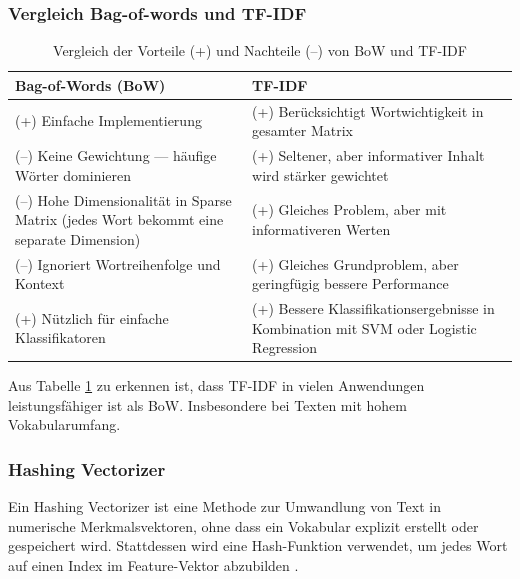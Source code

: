 \subsubsection{Vergleich Bag-of-words und TF-IDF}

\begin{table}[!ht]
    \renewcommand{\arraystretch}{1.3}
    \centering
        \begin{tabular}{|p{6.6cm}|p{6.6cm}|}
            \hline
            \rowcolor{lightgray} \textbf{Bag-of-Words (BoW)} & \textbf{TF-IDF} \\
            \hline
            (+) Einfache Implementierung \cite{cichosz2018forum} & (+) Berücksichtigt Wortwichtigkeit in gesamter Matrix  \cite{elov2023uzbek} \\
            \hline
            (–) Keine Gewichtung — häufige Wörter dominieren & (+) Seltener, aber informativer Inhalt wird stärker gewichtet \cite{das2023tfidf} \\
            \hline
            (–) Hohe Dimensionalität in Sparse Matrix (jedes Wort bekommt eine separate Dimension) \cite{ibm_bow} & (+) Gleiches Problem, aber mit informativeren Werten \cite{alzami2020tfidf} \\
            \hline
            (–) Ignoriert Wortreihenfolge und Kontext \cite{umar2022sentiment} & (+) Gleiches Grundproblem, aber geringfügig bessere Performance \cite{parmar2024stacking} \\
            \hline
            (+) Nützlich für einfache Klassifikatoren & (+) Bessere Klassifikationsergebnisse in Kombination mit SVM oder Logistic Regression \cite{iyer2024sentiment} \\
            \hline
        \end{tabular}
    \caption{Vergleich der Vorteile (+) und Nachteile (–) von BoW und TF-IDF}
    \label{tab:vergleich}
\end{table}

Aus Tabelle \ref{tab:vergleich} zu erkennen ist, dass TF-IDF in vielen Anwendungen leistungsfähiger ist als BoW. Insbesondere bei Texten mit hohem Vokabularumfang.

\subsubsection{Hashing Vectorizer}

Ein Hashing Vectorizer ist eine Methode zur Umwandlung von Text in numerische Merkmalsvektoren, ohne dass ein Vokabular explizit 
erstellt oder gespeichert wird. Stattdessen wird eine Hash-Funktion verwendet, um jedes Wort auf einen Index im Feature-Vektor abzubilden \cite{Buddhadev2025}.

